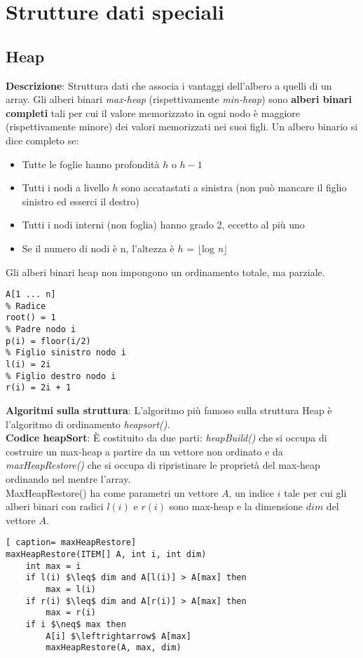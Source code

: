 \documentclass[../cheatSheetAlgoritmi.tex]{subfiles}
\begin{document}
\chapter{Strutture dati speciali}
\section{Heap}
\label{sec:heap}
\textbf{Descrizione}: Struttura dati che associa i vantaggi dell'albero a quelli di un array. Gli alberi binari \emph{max-heap} (rispettivamente \emph{min-heap}) sono \textbf{alberi binari completi} tali per cui il valore memorizzato in ogni nodo è maggiore (rispettivamente minore) dei valori memorizzati nei suoi figli. Un albero binario si dice completo se:
\begin{itemize}
 	\item Tutte le foglie hanno profondità $h$ o $h-1$ 
 	\item Tutti i nodi a livello $h$ sono accatastati a sinistra (non può mancare il figlio sinistro ed esserci il destro)
 	\item Tutti i nodi interni (non foglia) hanno grado 2, eccetto al più uno
 	\item Se il numero di nodi è n, l'altezza è $h$ = $\lfloor$log \textit{n}$\rfloor$
\end{itemize}
Gli alberi binari heap non impongono un ordinamento totale, ma parziale.
\begin{lstlisting}[caption= Memorizzazione Heap con Vettore]
% Vettore di memorizzazione
A[1 ... n]
% Radice
root() = 1
% Padre nodo i
p(i) = floor(i/2)
% Figlio sinistro nodo i
l(i) = 2i
% Figlio destro nodo i
r(i) = 2i + 1
\end{lstlisting}
\textbf{Algoritmi sulla struttura}: L'algoritmo più famoso sulla struttura Heap è l'algoritmo di ordinamento \emph{heapsort()}. \\
\textbf{Codice heapSort}: È costituito da due parti: \emph{heapBuild()} che si occupa di costruire un max-heap a partire da un vettore non ordinato e da \emph{maxHeapRestore()} che si occupa di ripristinare le proprietà del max-heap ordinando nel mentre l'array.  \\
MaxHeapRestore() ha come parametri un vettore $A$, un indice $i$ tale per cui gli alberi binari con radici $l(i)$ e $r(i)$ sono max-heap e la dimensione $dim$ del vettore $A$. 
\begin{lstlisting}[ caption= maxHeapRestore]
maxHeapRestore(ITEM[] A, int i, int dim)
	int max = i
	if l(i) $\leq$ dim and A[l(i)] > A[max] then
		max = l(i)
	if r(i) $\leq$ dim and A[r(i)] > A[max] then
		max = r(i)
	if i $\neq$ max then
		A[i] $\leftrightarrow$ A[max]
		maxHeapRestore(A, max, dim)
\end{lstlisting}
\end{document}
